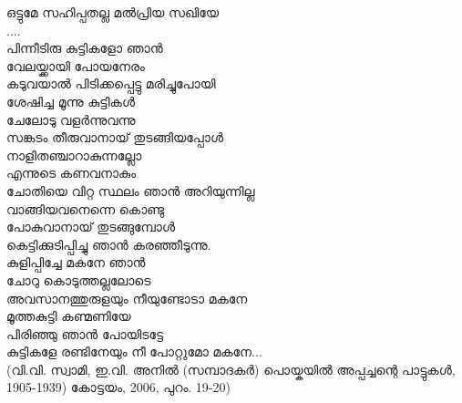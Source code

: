 \begin{tcolorbox}[%
 breakable, %
  arc=0mm, 
  left=1pt, right = 1pt, 
  boxrule=0mm,
  colback = {blue!10}, %
]
ഒട്ടുമേ സഹിപ്പതല്ല മൽപ്രിയ സഖിയേ\\
....\\
പിന്നീടിരു കുട്ടികളോ ഞാൻ\\
വേലയ്ക്കായി പോയനേരം\\
കടുവയാൽ പിടിക്കപ്പെട്ടു മരിച്ചുപോയി\\
ശേഷിച്ച മൂന്നു കുട്ടികൾ\\
ചേലോടു വളർന്നുവന്നു\\
സങ്കടം തീരുവാനായ് തുടങ്ങിയപ്പോൾ\\
നാളിതഞ്ചാറാകുന്നല്ലോ\\
എന്നുടെ കണവനാകും\\
ചോതിയെ വിറ്റ സ്ഥലം ഞാൻ അറിയുന്നില്ല\\
വാങ്ങിയവനെന്നെ കൊണ്ടു\\
പോകുവാനായ് തുടങ്ങുമ്പോൾ\\
കെട്ടിക്കുടിപ്പിച്ചു ഞാൻ കരഞ്ഞീടുന്നു.\\
കുളിപ്പിച്ചേ മകനേ ഞാൻ\\
ചോറു കൊടുത്തല്ലലോടെ\\
അവസാനത്തുരുളയും നീയുണ്ടോടാ മകനേ\\
മൂത്തകുട്ടി കണ്മണിയേ\\
പിരിഞ്ഞു ഞാൻ പോയിടട്ടേ\\
കുട്ടികളേ രണ്ടിനേയും നീ പോറ്റുമോ മകനേ...\\
(വി.വി. സ്വാമി, ഇ.വി. അനിൽ (സമ്പാദകർ) പൊയ്കയിൽ അപ്പച്ചന്റെ പാട്ടുകൾ, 1905-1939) കോട്ടയം, 2006, പുറം. 19-20)

\end{tcolorbox}


